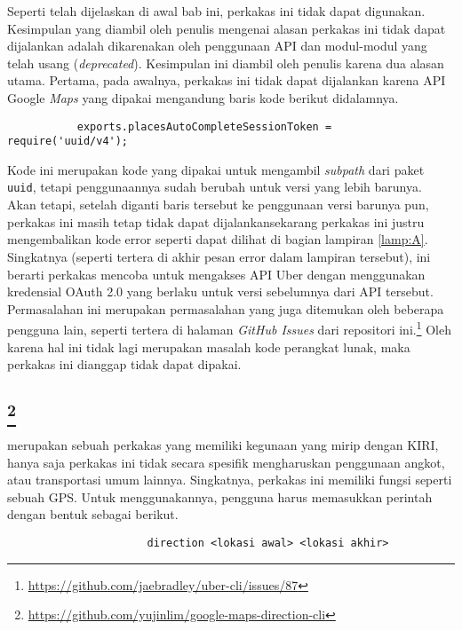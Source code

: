 Seperti telah dijelaskan di awal bab ini, perkakas ini tidak dapat digunakan. Kesimpulan yang diambil oleh penulis mengenai alasan perkakas ini tidak dapat dijalankan adalah dikarenakan oleh penggunaan API dan modul-modul yang telah usang (\textit{deprecated}). Kesimpulan ini diambil oleh penulis karena dua alasan utama. Pertama, pada awalnya, perkakas ini tidak dapat dijalankan karena API Google \textit{Maps} yang dipakai mengandung baris kode berikut didalamnya.

\begin{verbatim}
           exports.placesAutoCompleteSessionToken = require('uuid/v4');
\end{verbatim}

Kode ini merupakan kode yang dipakai untuk mengambil \textit{subpath} dari paket \verb|uuid|, tetapi penggunaannya sudah berubah untuk versi yang lebih barunya. Akan tetapi, setelah diganti baris tersebut ke penggunaan versi barunya pun, perkakas ini masih tetap tidak dapat dijalankan\textemdash sekarang perkakas ini justru mengembalikan kode error seperti dapat dilihat di bagian lampiran \ref{lamp:A}. Singkatnya (seperti tertera di akhir pesan error dalam lampiran tersebut), ini berarti perkakas mencoba untuk mengakses API Uber dengan menggunakan kredensial OAuth 2.0 yang berlaku untuk versi sebelumnya dari API tersebut. Permasalahan ini merupakan permasalahan yang juga ditemukan oleh beberapa pengguna lain, seperti tertera di halaman \textit{GitHub Issues} dari repositori ini.\footnote{\href{https://github.com/jaebradley/uber-cli/issues/87}{https://github.com/jaebradley/uber-cli/issues/87}} Oleh karena hal ini tidak lagi merupakan masalah kode perangkat lunak, maka perkakas ini dianggap tidak dapat dipakai.

\subsection{\googlemapscli\footnote{\href{https://github.com/yujinlim/google-maps-direction-cli}{https://github.com/yujinlim/google-maps-direction-cli}}}
\label{sec:similarapps-googlemapscli}

\googlemapscli merupakan sebuah perkakas \cl yang memiliki kegunaan yang mirip dengan KIRI, hanya saja perkakas ini tidak secara spesifik mengharuskan penggunaan angkot, atau transportasi umum lainnya. Singkatnya, perkakas ini memiliki fungsi seperti sebuah GPS. Untuk menggunakannya, pengguna harus memasukkan perintah dengan bentuk sebagai berikut.

\begin{verbatim}
                      direction <lokasi awal> <lokasi akhir>
\end{verbatim}

